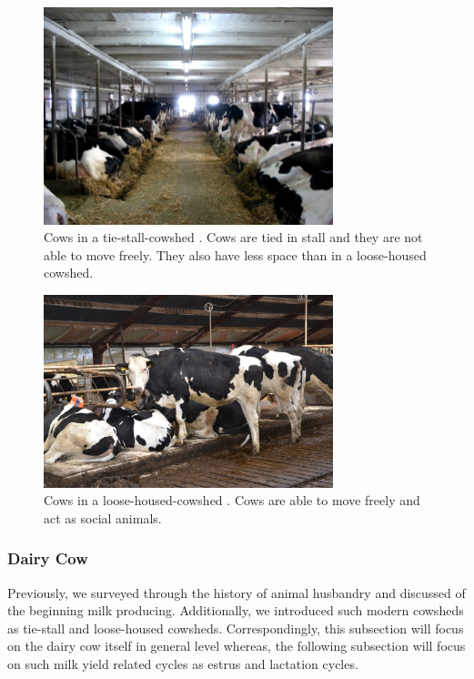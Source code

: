 \documentclass[english,12pt,a4paper,pdftex,elec,utf8]{aaltothesis}
\begin{document}
\begin{figure}
\centering
\includegraphics[width = 0.75\textwidth]{figures/tie-stall-barn.jpg}
\caption{Cows in a tie-stall-cowshed \cite{tiestallbarnpicture}. Cows are tied in stall and they are not able to move freely. They also have less space than in a loose-housed cowshed.}
\end{figure}

\begin{figure}
\centering
\includegraphics[width = 0.75\textwidth]{figures/free-stall-barn.jpg}
\caption{Cows in a loose-housed-cowshed \cite{freestallbarnpicture}. Cows are able to move freely and act as social animals.}
\end{figure}


\subsubsection{Dairy Cow} \label{dairycowsection}


Previously, we surveyed through the history of animal husbandry and discussed of the beginning milk producing. Additionally, we introduced such modern cowsheds as tie-stall and loose-housed cowsheds. Correspondingly, this subsection will focus on the dairy cow itself in general level whereas, the following subsection will focus on such milk yield related cycles as estrus and lactation cycles. 
\end{document}

